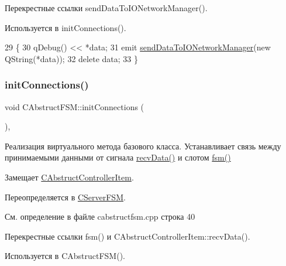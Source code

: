 Перекрестные ссылки send\+Data\+To\+I\+O\+Network\+Manager().



Используется в init\+Connections().


\begin{DoxyCode}
29 \{
30     qDebug() << *data;
31     emit \hyperlink{class_c_abstruct_f_s_m_a542570a7469e3923eeace7c3c308ff97}{sendDataToIONetworkManager}(\textcolor{keyword}{new} QString(*data));
32     \textcolor{keyword}{delete} data;
33 \}
\end{DoxyCode}
\hypertarget{class_c_abstruct_f_s_m_a9d6f4659a08f3028f8c047243f8dcfc3}{}\label{class_c_abstruct_f_s_m_a9d6f4659a08f3028f8c047243f8dcfc3} 
\subsubsection{\texorpdfstring{init\+Connections()}{initConnections()}}
{\footnotesize\ttfamily void C\+Abstruct\+F\+S\+M\+::init\+Connections (\begin{DoxyParamCaption}{ }\end{DoxyParamCaption})\hspace{0.3cm}{\ttfamily [protected]}, {\ttfamily [virtual]}}



Реализация виртуального метода базового класса. Устанавливает связь между принимаемыми данными от сигнала \hyperlink{class_c_abstruct_controller_item_a6898e48061cb0cac2065f8193bd386c1}{recv\+Data()} и слотом \hyperlink{class_c_abstruct_f_s_m_ae06497e1f93385cd6c20eaa84fc253c1}{fsm()} 



Замещает \hyperlink{class_c_abstruct_controller_item_a27c6889230a86cb0782e6d7596b883c1}{C\+Abstruct\+Controller\+Item}.



Переопределяется в \hyperlink{class_c_server_f_s_m_ae0e6a994505c26e60b718af9989bea77}{C\+Server\+F\+SM}.



См. определение в файле cabstructfsm.\+cpp строка 40



Перекрестные ссылки fsm() и C\+Abstruct\+Controller\+Item\+::recv\+Data().



Используется в C\+Abstruct\+F\+S\+M().


